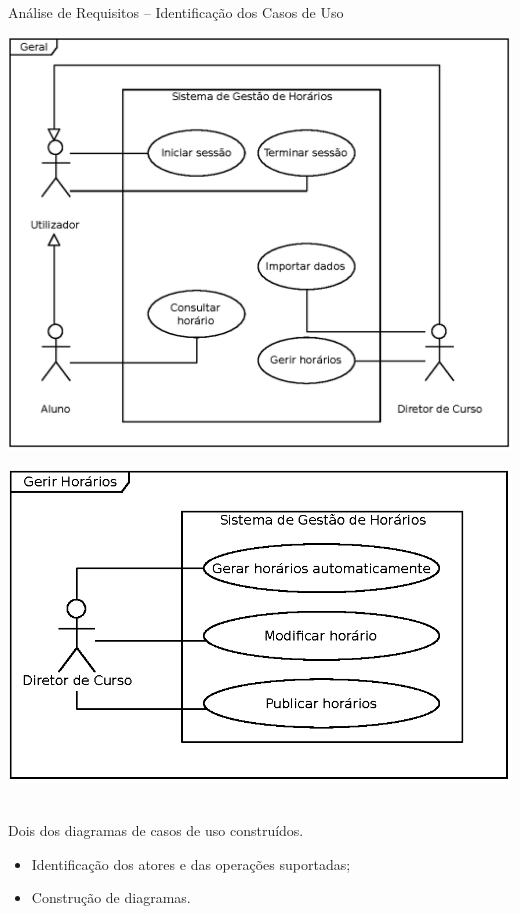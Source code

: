 \documentclass[13pt, handout]{beamer}
\begin{document}
\begin{frame}{Análise de Requisitos -- Identificação dos Casos de Uso}
    \centering

    \begin{minipage}{0.45\textwidth}
        \includegraphics[width=\textwidth]{Imagens/Modelos/UseCasesGeral.eps}
    \end{minipage}
    \hspace{0.5cm}
    \begin{minipage}{0.45\textwidth}
        \includegraphics[width=\textwidth]{Imagens/Modelos/UseCasesGerirHorarios.eps}
    \end{minipage} \\
    \vspace{0.25cm}
    {\scriptsize Dois dos diagramas de casos de uso construídos.}

    \vspace{0.5cm}
    \begin{itemize}
        \item Identificação dos atores e das operações suportadas;
        \item Construção de diagramas.
    \end{itemize}
\end{frame}
\end{document}
